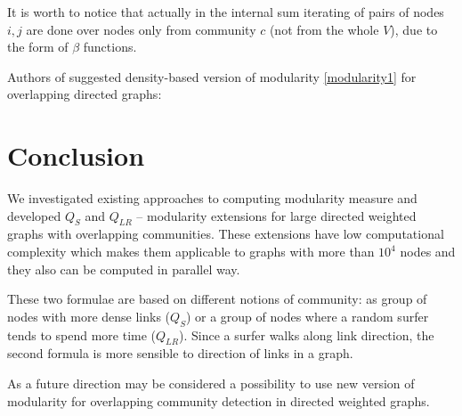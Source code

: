 \documentclass[a4paper,twocolumn]{article}
\begin{document}
It is worth to notice that actually in the internal sum iterating of pairs of nodes $i,j$ are done over nodes only from community $c$ (not from the whole $V$), due to the form of $\beta$ functions.

Authors of \cite{Chen2015} suggested density-based version of modularity \eqref{modularity1} for overlapping directed graphs:





\section{Conclusion}

We investigated existing approaches to computing modularity measure and developed $Q_S$ and $Q_{LR}$ -- modularity extensions for large directed weighted graphs with overlapping communities. These extensions have low computational complexity which makes them applicable to graphs with more than $10^4$ nodes and they also can be computed in parallel way.

These two formulae are based on different notions of community: as group of nodes with more dense links ($Q_S$) or a group of nodes where a random surfer tends to spend more time ($Q_{LR}$). Since a surfer walks along link direction, the second formula is more sensible to direction of links in a graph.

As a future direction may be considered a possibility to use new version of modularity for overlapping community detection in directed weighted graphs.

\printbibliography
\end{document}
